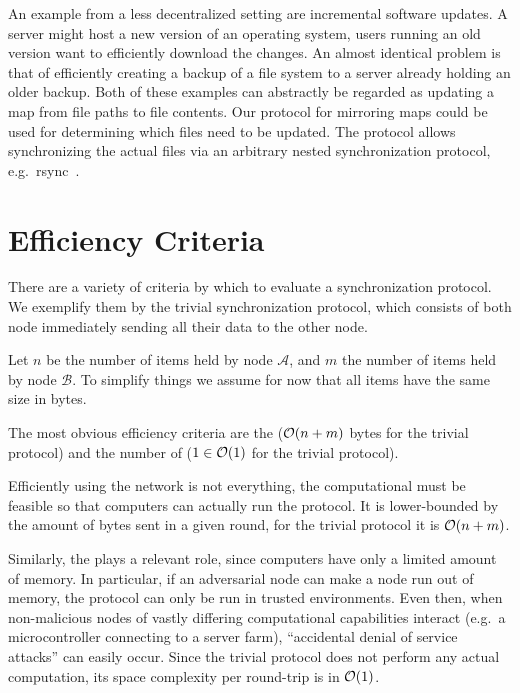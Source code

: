 An example from a less decentralized setting are incremental software
updates. A server might host a new version of an operating system, users
running an old version want to efficiently download the changes. An
almost identical problem is that of efficiently creating a backup of a file
system to a server already holding an older backup. Both of these
examples can abstractly be regarded as updating a map from file paths to
file contents. Our protocol for mirroring maps could be used for
determining which files need to be updated. The protocol allows
synchronizing the actual files via an arbitrary nested synchronization
protocol, e.g.~rsync~\cite{tridgell1996rsync}.

\section{Efficiency Criteria}\label{efficiency-criteria}

There are a variety of criteria by which to evaluate a synchronization
protocol. We exemplify them by the trivial synchronization protocol,
which consists of both node immediately sending all their data to the
other node.

Let $n$ be the number of items held by node $\mathcal{A}$, and $m$ the number of items
held by node $\mathcal{B}$. To simplify things we assume for now that all items have
the same size in bytes.

The most obvious efficiency criteria are the 
($\mathcal{O}(n + m)$ bytes for the trivial protocol) and the number of
 ($1 \in \mathcal{O}(1)$ for the trivial protocol).

Efficiently using the network is not everything, the computational
 must be feasible so that
computers can actually run the protocol. It is lower-bounded by the
amount of bytes sent in a given round, for the trivial protocol it is
$\mathcal{O}(n + m)$.

Similarly, the  plays a relevant
role, since computers have only a limited amount of memory. In
particular, if an adversarial node can make a node run out of memory,
the protocol can only be run in trusted environments. Even then, when
non-malicious nodes of vastly differing computational capabilities
interact (e.g.~a microcontroller connecting to a server farm),
``accidental denial of service attacks'' can easily occur. Since the
trivial protocol does not perform any actual computation, its space
complexity per round-trip is in $\mathcal{O}(1)$.

